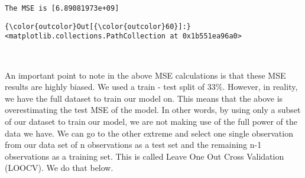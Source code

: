 \documentclass[11pt]{article}
\begin{document}
    \begin{Verbatim}[commandchars=\\\{\}]
The MSE is [6.89081973e+09]

    \end{Verbatim}

\begin{Verbatim}[commandchars=\\\{\}]
{\color{outcolor}Out[{\color{outcolor}60}]:} <matplotlib.collections.PathCollection at 0x1b551ea96a0>
\end{Verbatim}
            
    \begin{center}
    \end{center}
    { \hspace*{\fill} \\}
    
    An important point to note in the above MSE calculations is that these
MSE results are highly biased. We used a train - test split of 33\%.
However, in reality, we have the full dataset to train our model on.
This means that the above is overestimating the test MSE of the model.
In other words, by using only a subset of our dataset to train our
model, we are not making use of the full power of the data we have. We
can go to the other extreme and select one single observation from our
data set of n observations as a test set and the remaining n-1
observations as a training set. This is called Leave One Out Cross
Validation (LOOCV). We do that below.
\end{document}
